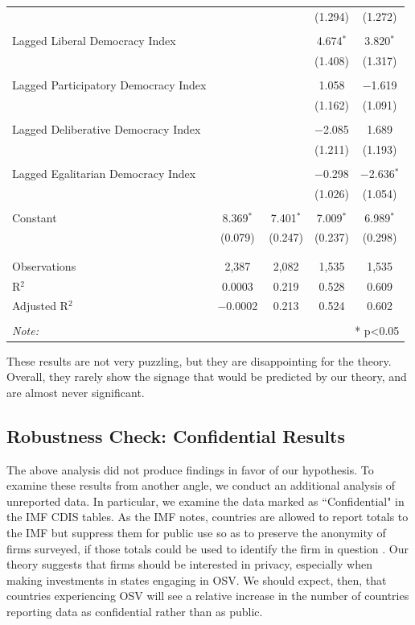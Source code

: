 \documentclass[11pt, titlepage]{article} %
\begin{document}
\begin{table}[!htbp]
\begin{tabular}{@{\extracolsep{5pt}}lcccc}
  &  &  & (1.294) & (1.272) \\ 
  & & & & \\ 
 Lagged Liberal Democracy Index &  &  & 4.674$^{*}$ & 3.820$^{*}$ \\ 
  &  &  & (1.408) & (1.317) \\ 
  & & & & \\ 
 Lagged Participatory Democracy Index &  &  & 1.058 & $-$1.619 \\ 
  &  &  & (1.162) & (1.091) \\ 
  & & & & \\ 
 Lagged Deliberative Democracy Index &  &  & $-$2.085 & 1.689 \\ 
  &  &  & (1.211) & (1.193) \\ 
  & & & & \\ 
 Lagged Egalitarian Democracy Index &  &  & $-$0.298 & $-$2.636$^{*}$ \\ 
  &  &  & (1.026) & (1.054) \\ 
  & & & & \\ 
 Constant & 8.369$^{*}$ & 7.401$^{*}$ & 7.009$^{*}$ & 6.989$^{*}$ \\ 
  & (0.079) & (0.247) & (0.237) & (0.298) \\ 
  & & & & \\ 
\hline \\[-1.8ex] 
Observations & 2,387 & 2,082 & 1,535 & 1,535 \\ 
R$^{2}$ & 0.0003 & 0.219 & 0.528 & 0.609 \\ 
Adjusted R$^{2}$ & $-$0.0002 & 0.213 & 0.524 & 0.602 \\ 
\hline 
\hline \\[-1.8ex] 
\textit{Note:}  & \multicolumn{4}{r}{* p<0.05} \\ 
\end{tabular} 
\end{table} 

These results are not very puzzling, but they are disappointing for the theory. Overall, they rarely show the signage that would be predicted by our theory, and are almost never significant. 

\subsection*{Robustness Check: Confidential Results}

The above analysis did not produce findings in favor of our hypothesis. To examine these results from another angle, we conduct an additional analysis of unreported data. In particular, we examine the data marked as ``Confidential" in the IMF CDIS tables. As the IMF notes, countries are allowed to report totals to the IMF but suppress them for public use so as to preserve the anonymity of firms surveyed, if those totals could be used to identify the firm in question \parencite{internationalmonetaryfundCoordinatedDirectInvestment2015}. Our theory suggests that firms should be interested in privacy, especially when making investments in states engaging in OSV. We should expect, then, that countries experiencing OSV will see a relative increase in the number of countries reporting data as confidential rather than as public. 
\end{document}
